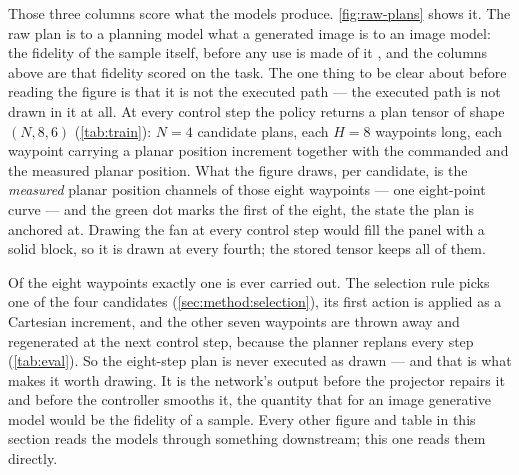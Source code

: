 \FloatBarrier

Those three columns score what the models produce. \autoref{fig:raw-plans} shows it. The raw plan is to a
planning model what a generated image is to an image model: the fidelity of the sample itself, before any
use is made of it \parencite{ho2020denoising,lipman2023flow,geng2025meanflow}, and the columns above are
that fidelity scored on the task. The one thing to be clear about before reading the figure is that it is
not the executed path --- the executed path is not drawn in it
at all. At every control step the policy returns a plan tensor of shape $(N,8,6)$
(\autoref{tab:train}): $N=4$ candidate plans, each $H=8$ waypoints long, each waypoint carrying a planar
position increment together with the commanded and the measured planar position. What the figure draws,
per candidate, is the \emph{measured} planar position channels of those eight waypoints --- one
eight-point curve --- and the green dot marks the first of the eight, the state the plan is anchored at.
Drawing the fan at every control step would fill the panel with a solid block, so it is drawn at every
fourth; the stored tensor keeps all of them.

Of the eight waypoints exactly one is ever carried out. The selection rule picks one of the four
candidates (\autoref{sec:method:selection}), its first action is applied as a Cartesian increment, and the
other seven waypoints are thrown away and regenerated at the next control step, because the planner
replans every step (\autoref{tab:eval}). So the eight-step plan is never executed as drawn --- and that is
what makes it worth drawing. It is the network's output before the projector repairs it and before the
controller smooths it, the quantity that for an image generative model would be the fidelity of a sample.
Every other figure and table in this section reads the models through something downstream; this one reads
them directly.

